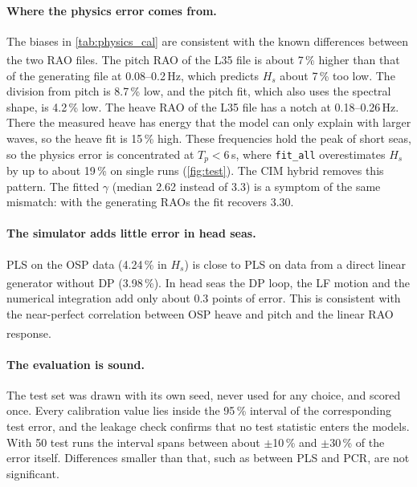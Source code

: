 \documentclass[11pt,a4paper]{article}
\newcommand{\Hs}{H_{s}}
\newcommand{\Tp}{T_{p}}
\newcommand{\pct}[1]{#1\,\%}
\newcommand{\dagnote}{\textsuperscript{\dag}}
\begin{document}
\paragraph{Where the physics error comes from.}
The biases in \cref{tab:physics_cal} are consistent with the known differences between the two
RAO files\dagnote. The pitch RAO of the L35 file is about \pct{7} higher than that of the
generating file at 0.08--0.2\,Hz, which predicts $\Hs$ about \pct{7} too low. The division from
pitch is \pct{8.7} low, and the pitch fit, which also uses the spectral shape, is \pct{4.2} low.
The heave RAO of the L35 file has a notch at 0.18--0.26\,Hz. There the measured heave has energy
that the model can only explain with larger waves, so the heave fit is \pct{15} high. These
frequencies hold the peak of short seas, so the physics error is concentrated at $\Tp < 6$\,s,
where \texttt{fit\_all} overestimates $\Hs$ by up to about \pct{19} on single runs
(\cref{fig:test}). The CIM hybrid removes this pattern. The fitted $\gamma$ (median 2.62 instead of
3.3) is a symptom of the same mismatch: with the generating RAOs the fit recovers 3.30.

\paragraph{The simulator adds little error in head seas.}
PLS on the OSP data (\pct{4.24} in $\Hs$) is close to PLS on data from a direct linear generator
without DP (\pct{3.98}\dagnote). In head seas the DP loop, the LF motion and the numerical
integration add only about 0.3 points of error. This is consistent with the near-perfect
correlation between OSP heave and pitch and the linear RAO response\dagnote.

\paragraph{The evaluation is sound.}
The test set was drawn with its own seed, never used for any choice, and scored once. Every
calibration value lies inside the 95\,\% interval of the corresponding test error, and the
leakage check confirms that no test statistic enters the models. With 50 test runs the interval
spans between about $\pm$10\,\% and $\pm$30\,\% of the error itself. Differences smaller than
that, such as between PLS and PCR, are not significant.
\end{document}

